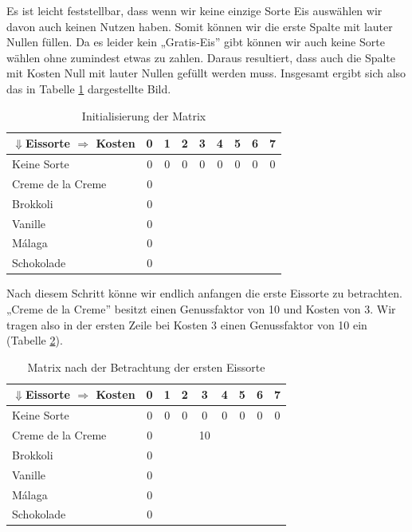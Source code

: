 \documentclass[a4paper, 12pt]{article}
\begin{document}
Es ist leicht feststellbar, dass wenn wir keine einzige Sorte Eis auswählen
wir davon auch keinen Nutzen haben. Somit können wir die erste Spalte mit
lauter Nullen füllen. Da es leider kein „Gratis-Eis” gibt können wir auch
keine Sorte wählen ohne zumindest etwas zu zahlen. Daraus resultiert, dass
auch die Spalte mit Kosten Null mit lauter Nullen gefüllt werden muss.
Insgesamt ergibt sich also das in Tabelle \ref{table:Initialisierung}
dargestellte Bild.

\begin{table}[H]
	\begin{center}
		\begin{tabular}{l|cccccccc}
			$⇓$Eissorte $⇒$ Kosten & 0 & 1 & 2 & 3 & 4 & 5 &
			6 & 7\\
			\hline
			Keine Sorte			& 0 & 0 & 0 & 0 & 0 & 0 & 0 & 0 \\
			Creme de la Creme	& 0 &	&	&	&	&	&	&	\\
			Brokkoli			& 0 &	&	&	&	&	&	&	\\
			Vanille				& 0 &	&	&	&	&	&	&	\\
			Málaga				& 0 &	&	&	&	&	&	&	\\
			Schokolade			& 0 &	&	&	&	&	&	&	\\
		\end{tabular}
	\end{center}
\caption{Initialisierung der Matrix}
\label{table:Initialisierung}
\end{table}

Nach diesem Schritt könne wir endlich anfangen die erste Eissorte zu
betrachten. „Creme de la Creme” besitzt einen Genussfaktor von 10 und Kosten
von 3. Wir tragen also in der ersten Zeile bei Kosten 3 einen Genussfaktor von
10 ein (Tabelle \ref{table:1_Eis}).

\begin{table}[H]
	\begin{center}
		\begin{tabular}{l|cccccccc}
			$⇓$Eissorte $⇒$ Kosten & 0 & 1 & 2 & 3 & 4 & 5 &
			6 & 7\\
			\hline
			Keine Sorte			& 0 & 0 & 0 & 0	 & 0	& 0 & 0 & 0 \\
			Creme de la Creme	& 0 &	&	& 10 &	&	&	&	\\
			Brokkoli			& 0 &	&	&	 &	&	&	&	\\
			Vanille				& 0 &	&	&	 &	&	&	&	\\
			Málaga				& 0 &	&	&	 &	&	&	&	\\
			Schokolade			& 0 &	&	&	 &	&	&	&	\\
		\end{tabular}
	\end{center}
\caption{Matrix nach der Betrachtung der ersten Eissorte}
\label{table:1_Eis}
\end{table}
\end{document}
